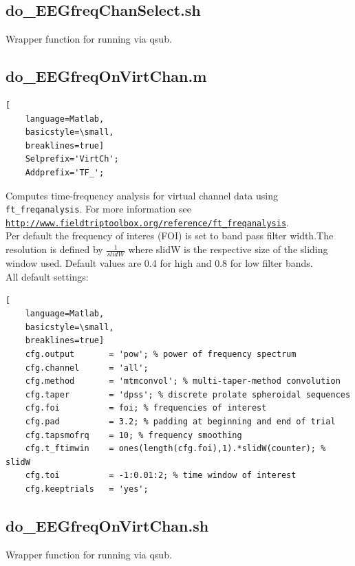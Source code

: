 \documentclass[12pt,a4paper]{scrartcl}
\begin{document}
\subsection{do\_EEGfreqChanSelect.sh}
\label{sh:selchan}
Wrapper function for running \texttt{} via qsub.\\

\subsection{do\_EEGfreqOnVirtChan.m}
\label{m:freqVirt}
\begin{lstlisting}[
    language=Matlab,
    basicstyle=\small,
    breaklines=true]
    Selprefix='VirtCh';
    Addprefix='TF_';
\end{lstlisting}
Computes time-frequency analysis for virtual channel data using \texttt{ft\_freqanalysis}. For more information see \href{http://www.fieldtriptoolbox.org/reference/ft\_freqanalysis}{\nolinkurl{http://www.fieldtriptoolbox.org/reference/ft\_freqanalysis}}.\\
\noindent Per default the frequency of interes (FOI) is set to band pass filter width.The resolution is defined by $\frac{1}{slidW}$ where slidW is the respective size of the sliding window used. Default values are 0.4 for high and 0.8 for low filter bands.\\

\noindent All default settings:
\begin{lstlisting}[
    language=Matlab,
    basicstyle=\small,
    breaklines=true]
    cfg.output       = 'pow'; % power of frequency spectrum
    cfg.channel      = 'all';
    cfg.method       = 'mtmconvol'; % multi-taper-method convolution
    cfg.taper        = 'dpss'; % discrete prolate spheroidal sequences
    cfg.foi          = foi; % frequencies of interest
    cfg.pad          = 3.2; % padding at beginning and end of trial
    cfg.tapsmofrq    = 10; % frequency smoothing
    cfg.t_ftimwin    = ones(length(cfg.foi),1).*slidW(counter); % slidW
    cfg.toi          = -1:0.01:2; % time window of interest
    cfg.keeptrials   = 'yes';
\end{lstlisting}

\subsection{do\_EEGfreqOnVirtChan.sh}
\label{sh:freqVirt}
Wrapper function for running \texttt{} via qsub.\\
\end{document}
